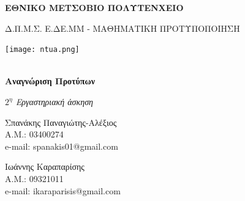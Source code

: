 \documentclass[a4paper,12pt]{article}
\begin{document}
\begin{titlepage}
    \begin{center}
        \vspace*{1cm}
        
        \Large
        \textbf{ΕΘΝΙΚΟ ΜΕΤΣΟΒΙΟ ΠΟΛΥΤΕΝΧΕΙΟ}
        
        \vspace*{0.5cm}

        \large 
        Δ.Π.Μ.Σ. Ε.ΔΕ.ΜΜ - ΜΑΘΗΜΑΤΙΚΗ ΠΡΟΤΥΠΟΠΟΙΗΣΗ

        \texttt{[image: ntua.png]}

        \large
        \textbf{\\Αναγνώριση Προτύπων}
        
        
        
        \vspace{2.5cm}
        \small
        \textit{$2^η$ Εργαστηριακή άσκηση}        
        


    
    \end{center}
    
    
    \begin{flushright}
        \vfill
        Σπανάκης Παναγιώτης-Αλέξιος
        \\Α.Μ.: 03400274
        \\e-mail: spanakis01@gmail.com
    \end{flushright}

    \begin{flushleft}
        \vfill
        Ιωάννης Καραπαρίσης
        \\Α.Μ.: 09321011
        \\e-mail: ikaraparisis@gmail.com
    \end{flushleft}
    
\end{titlepage}

\newpage
\end{document}
